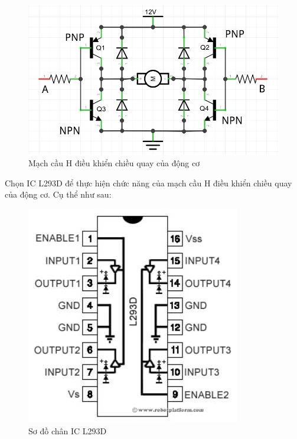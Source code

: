 \begin{figure}[!h]
\begin{center}
\includegraphics[scale=0.3]{bai-8/image/mach-cau-H}
\end{center}
\caption{Mạch cầu H điều khiển chiều quay của động cơ}
\end{figure}
\newpage
Chọn IC L293D để thực hiện chức năng của mạch cầu H điều khiển chiều quay của động cơ. Cụ thể như sau:
\begin{figure}[!h]
\begin{center}
\includegraphics[scale=0.35]{bai-8/image/L293D}
\end{center}
\caption{Sơ đồ chân IC L293D}
\end{figure}

